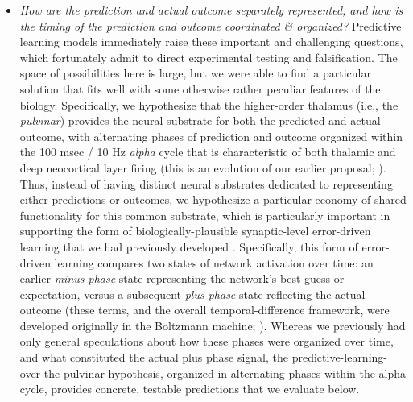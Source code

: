 \documentclass[11pt,twoside]{article}
\newif\myifpdf
\begin{document}
\begin{itemize}
\item {\em How are the prediction and actual outcome separately represented, and how is the timing of the prediction and outcome coordinated \& organized?}  Predictive learning models immediately raise these important and challenging questions, which fortunately admit to direct experimental testing and falsification.  The space of possibilities here is large, but we were able to find a particular solution that fits well with some otherwise rather peculiar features of the biology.  Specifically, we hypothesize that the higher-order thalamus (i.e., the {\em pulvinar}) provides the neural substrate for both the predicted and actual outcome, with alternating phases of prediction and outcome organized within the 100 msec / 10 Hz {\em alpha} cycle that is characteristic of both thalamic and deep neocortical layer firing (this is an evolution of our earlier proposal; ).  Thus, instead of having distinct neural substrates dedicated to representing either predictions or outcomes, we hypothesize a particular economy of shared functionality for this common substrate, which is particularly important in supporting the form of biologically-plausible synaptic-level error-driven learning that we had previously developed \cite{OReilly96}.  Specifically, this form of error-driven learning compares two states of network activation over time: an earlier {\em minus phase} state representing the network's best guess or expectation, versus a subsequent {\em plus phase} state reflecting the actual outcome (these terms, and the overall temporal-difference framework, were developed originally in the Boltzmann machine; ).  Whereas we previously had only general speculations about how these phases were organized over time, and what constituted the actual plus phase signal, the predictive-learning-over-the-pulvinar hypothesis, organized in alternating phases within the alpha cycle, provides concrete, testable predictions that we evaluate below.


\end{itemize}
\end{document}
